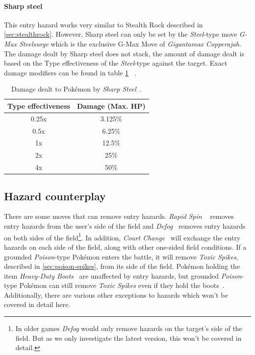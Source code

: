 \paragraph{Sharp steel}
This entry hazard works very similar to Stealth Rock described in \ref{sec:stealthrock}.
However, Sharp steel can only be set by the \textit{Steel}-type move
\textit{G-Max Steelsurge} which is the exclusive G-Max Move of \textit{Gigantamax Copperajah}.
The damage dealt by Sharp steel does not stack, the amount of damage dealt is
based on the Type effectiveness of the \textit{Steel}-type against the target.
Exact damage modifiers can be found in table \ref{tab:sharp-steel-damage}
~\autocite{Bulbapedia:GMaxSteelsurge}.
\begin{table}[h]
	\centering
	\caption{Damage dealt to Pokémon by \textit{Sharp Steel}~\autocite{Bulbapedia:GMaxSteelsurge}.}
	\label{tab:sharp-steel-damage}
	\begin{tabular}{|c|c|}
		\hline
		\textbf{Type effectiveness} & \textbf{Damage (Max. \ac{HP}}) \\
		\hline 
		0.25x & 3.125\% \\ 
		\hline 
		0.5x &  6.25\% \\ 
		\hline 
		1x & 12.5\% \\
		\hline
		2x & 25\% \\
		\hline
		4x & 50\% \\
		\hline
	\end{tabular} 
\end{table}

\subsection{Hazard counterplay}
There are some moves that can remove entry hazards. \textit{Rapid Spin} 
~\autocite{Bulbapedia:RapidSpin} removes entry hazards from the user's side of the field and
\textit{Defog}~\autocite{Bulbapedia:Defog} removes entry hazards on both sides of the 
field\footnote{In older games \textit{Defog} would only remove hazards on the
target's side of the field. But as we only investigate the latest version, this
won't be covered in detail.}. In addition, 
\textit{Court Change}~\autocite{Bulbapedia:CourtChange} will exchange the entry hazards
on each side of the field, along with other one-sided field conditions.
If a grounded
\textit{Poison}-type Pokémon enters the battle, it will remove \textit{Toxic 
Spikes}, described in \ref{sec:poison-spikes}, from its side of the field.
Pokémon holding the item 
\textit{Heavy-Duty Boots}~\autocite{Bulbapedia:HeavyDutyBoots} are unaffected by
entry hazards, but grounded \textit{Poison}-type Pokémon can still remove
\textit{Toxic Spikes} even if they hold the boots~\autocite{Bulbapedia:EntryHazards}.
Additionally, there are various other exceptions to hazards which won't be covered in detail here.

